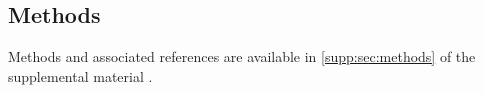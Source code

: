 \subsection*{Methods}

Methods and associated references are available in \cref{supp:sec:methods} of
the supplemental material \cite{supplement}.